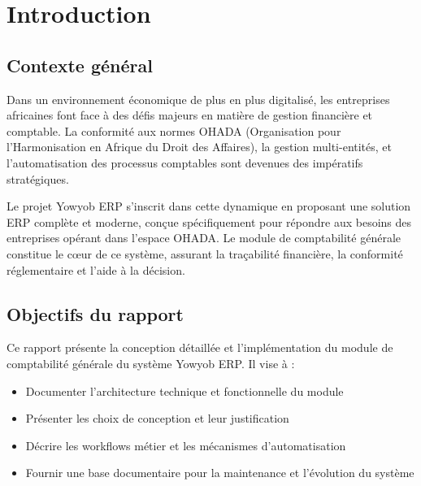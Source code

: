 \documentclass[12pt]{report}
\begin{document}
 

\clearpage
\tableofcontents
\clearpage
\listoffigures
\clearpage

\pagestyle{fancy}

\chapter{Introduction}

\section{Contexte général}
Dans un environnement économique de plus en plus digitalisé, les entreprises africaines font face à des défis majeurs en matière de gestion financière et comptable. La conformité aux normes OHADA (Organisation pour l'Harmonisation en Afrique du Droit des Affaires), la gestion multi-entités, et l'automatisation des processus comptables sont devenues des impératifs stratégiques.

Le projet Yowyob ERP s'inscrit dans cette dynamique en proposant une solution ERP complète et moderne, conçue spécifiquement pour répondre aux besoins des entreprises opérant dans l'espace OHADA. Le module de comptabilité générale constitue le cœur de ce système, assurant la traçabilité financière, la conformité réglementaire et l'aide à la décision.

\section{Objectifs du rapport}
Ce rapport présente la conception détaillée et l'implémentation du module de comptabilité générale du système Yowyob ERP. Il vise à :
\begin{itemize}
    \item Documenter l'architecture technique et fonctionnelle du module
    \item Présenter les choix de conception et leur justification
    \item Décrire les workflows métier et les mécanismes d'automatisation
    \item Fournir une base documentaire pour la maintenance et l'évolution du système
\end{itemize}
\end{document}
